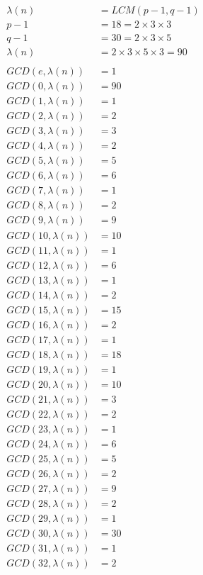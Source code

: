 \documentclass[uplatex]{jsarticle}
\begin{document}
\begin{align*}
  \lambda(n)&= LCM(p - 1, q- 1)\\
  p - 1&= 18 = 2 \times 3 \times 3\\
  q - 1&= 30 = 2 \times 3 \times 5\\
  \lambda(n)&= 2 \times 3 \times 5 \times 3 = 90\\\\
  GCD(e, \lambda(n))&= 1\\
  GCD(0, \lambda(n))&= 90\\
GCD(1, \lambda(n))&= 1\\
GCD(2, \lambda(n))&= 2\\
GCD(3, \lambda(n))&= 3\\
GCD(4, \lambda(n))&= 2\\
GCD(5, \lambda(n))&= 5\\
GCD(6, \lambda(n))&= 6\\
GCD(7, \lambda(n))&= 1\\
GCD(8, \lambda(n))&= 2\\
GCD(9, \lambda(n))&= 9\\
GCD(10, \lambda(n))&= 10\\
GCD(11, \lambda(n))&= 1\\
GCD(12, \lambda(n))&= 6\\
GCD(13, \lambda(n))&= 1\\
GCD(14, \lambda(n))&= 2\\
GCD(15, \lambda(n))&= 15\\
GCD(16, \lambda(n))&= 2\\
GCD(17, \lambda(n))&= 1\\
GCD(18, \lambda(n))&= 18\\
GCD(19, \lambda(n))&= 1\\
GCD(20, \lambda(n))&= 10\\
GCD(21, \lambda(n))&= 3\\
GCD(22, \lambda(n))&= 2\\
GCD(23, \lambda(n))&= 1\\
GCD(24, \lambda(n))&= 6\\
GCD(25, \lambda(n))&= 5\\
GCD(26, \lambda(n))&= 2\\
GCD(27, \lambda(n))&= 9\\
GCD(28, \lambda(n))&= 2\\
GCD(29, \lambda(n))&= 1\\
GCD(30, \lambda(n))&= 30\\
GCD(31, \lambda(n))&= 1\\
GCD(32, \lambda(n))&= 2\\

\end{align*}
\end{document}
